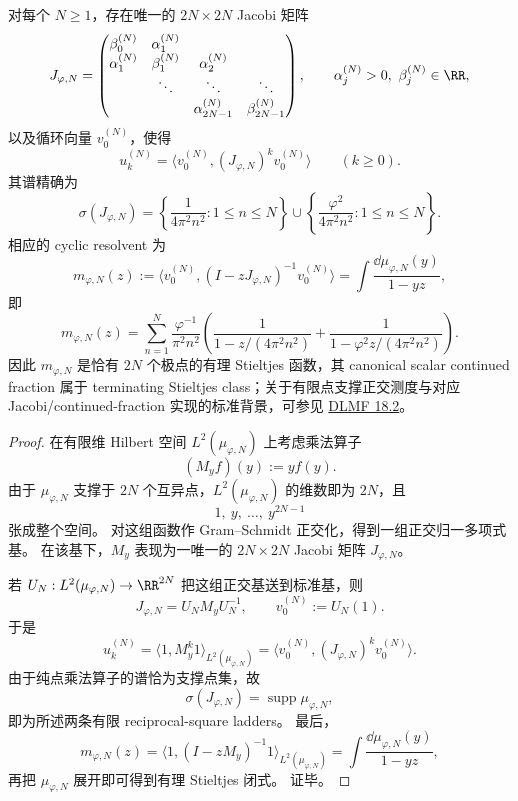 \begin{theorem}\label{thm:xi-time-part9zbg-foldpi-finite-rank-jacobi-fredholm-realization}
对每个 \(N\ge 1\)，存在唯一的 \(2N\times 2N\) Jacobi 矩阵
\[
J_{\varphi,N}
=
\begin{pmatrix}
\beta_0^{(N)} & \alpha_1^{(N)} \\
\alpha_1^{(N)} & \beta_1^{(N)} & \alpha_2^{(N)} \\
& \ddots & \ddots & \ddots \\
&& \alpha_{2N-1}^{(N)} & \beta_{2N-1}^{(N)}
\end{pmatrix},
\qquad
\alpha_j^{(N)}>0,\ \beta_j^{(N)}\in\RR,
\]
以及循环向量 \(v_0^{(N)}\)，使得
\[
u_k^{(N)}=\langle v_0^{(N)},(J_{\varphi,N})^k v_0^{(N)}\rangle
\qquad (k\ge 0).
\]
其谱精确为
\[
\sigma(J_{\varphi,N})
=
\left\{\frac{1}{4\pi^2n^2}:1\le n\le N\right\}
\cup
\left\{\frac{\varphi^2}{4\pi^2n^2}:1\le n\le N\right\}.
\]
相应的 cyclic resolvent 为
\[
m_{\varphi,N}(z)
:=
\langle v_0^{(N)},(I-zJ_{\varphi,N})^{-1}v_0^{(N)}\rangle
=
\int\frac{\dd\mu_{\varphi,N}(y)}{1-yz},
\]
即
\[
m_{\varphi,N}(z)
=
\sum_{n=1}^{N}\frac{\varphi^{-1}}{\pi^2n^2}
\left(
\frac{1}{1-z/(4\pi^2n^2)}
+
\frac{1}{1-\varphi^2z/(4\pi^2n^2)}
\right).
\]
因此 \(m_{\varphi,N}\) 是恰有 \(2N\) 个极点的有理 Stieltjes 函数，其 canonical scalar continued fraction 属于 terminating Stieltjes class；关于有限点支撑正交测度与对应 Jacobi/continued-fraction 实现的标准背景，可参见 \href{https://dlmf.nist.gov/18.2}{DLMF 18.2}。
\end{theorem}
\begin{proof}
在有限维 Hilbert 空间 \(L^2(\mu_{\varphi,N})\) 上考虑乘法算子
\[
(M_yf)(y):=y f(y).
\]
由于 \(\mu_{\varphi,N}\) 支撑于 \(2N\) 个互异点，\(L^2(\mu_{\varphi,N})\) 的维数即为 \(2N\)，且
\[
1,\ y,\ \dots,\ y^{2N-1}
\]
张成整个空间。
对这组函数作 Gram--Schmidt 正交化，得到一组正交归一多项式基。
在该基下，\(M_y\) 表现为一唯一的 \(2N\times 2N\) Jacobi 矩阵 \(J_{\varphi,N}\)。

若 \(U_N:L^2(\mu_{\varphi,N})\to \RR^{2N}\) 把这组正交基送到标准基，则
\[
J_{\varphi,N}=U_NM_yU_N^{-1},
\qquad
v_0^{(N)}:=U_N(1).
\]
于是
\[
u_k^{(N)}
=
\langle 1,M_y^k1\rangle_{L^2(\mu_{\varphi,N})}
=
\langle v_0^{(N)},(J_{\varphi,N})^k v_0^{(N)}\rangle.
\]
由于纯点乘法算子的谱恰为支撑点集，故
\[
\sigma(J_{\varphi,N})=\operatorname{supp}\mu_{\varphi,N},
\]
即为所述两条有限 reciprocal-square ladders。
最后，
\[
m_{\varphi,N}(z)
=
\langle 1,(I-zM_y)^{-1}1\rangle_{L^2(\mu_{\varphi,N})}
=
\int\frac{\dd\mu_{\varphi,N}(y)}{1-yz},
\]
再把 \(\mu_{\varphi,N}\) 展开即可得到有理 Stieltjes 闭式。
证毕。
\end{proof}

